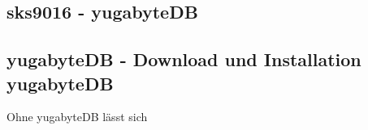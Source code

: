 
\begin{flushleft}
    \section{sks9016 - yugabyteDB}
    \subsection{yugabyteDB - Download und Installation yugabyteDB}
    Ohne yugabyteDB lässt sich
\end{flushleft}